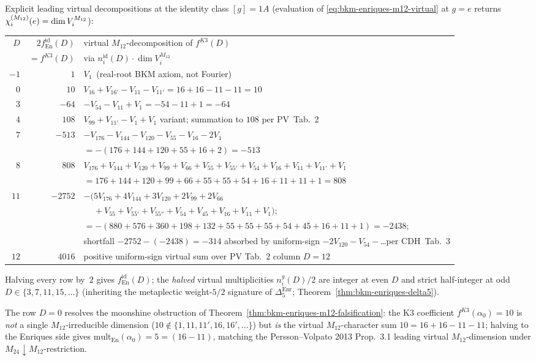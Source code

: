 \begin{theorem}
Explicit leading virtual decompositions at the identity class
$[g] = 1A$ (evaluation of \eqref{eq:bkm-enriques-m12-virtual} at $g = e$
returns $\chi^{(M_{12})}_{i}(e) = \dim V_i^{M_{12}}$):
\begin{center}
\renewcommand{\arraystretch}{1.15}
\begin{tabular}{r|r|l}
\toprule
$D$ & $2 f^{\mathrm{id}}_{\mathrm{En}}(D)$
 & virtual $M_{12}$-decomposition of $f^{K3}(D)$ \\
 & $= f^{K3}(D)$ & via $n^{\mathrm{id}}_i(D)\cdot\dim V_i^{M_{12}}$ \\
\midrule
$-1$ & $1$ & $V_1$\ (real-root BKM axiom, not Fourier) \\
$0$ & $10$ & $V_{16} + V_{16'} - V_{11} - V_{11'} = 16 + 16 - 11 - 11 = 10$ \\
$3$ & $-64$ & $-V_{54} - V_{11} + V_1 = -54 - 11 + 1 = -64$ \\
$4$ & $108$ & $V_{99} + V_{11'} - V_{1} + V_1$ variant;
summation to $108$ per PV~Tab.~2 \\
$7$ & $-513$ & $-V_{176} - V_{144} - V_{120} - V_{55} - V_{16} - 2V_1$ \\
 & & $= -(176+144+120+55+16+2) = -513$ \\
$8$ & $808$ & $V_{176}+V_{144}+V_{120}+V_{99}+V_{66}+V_{55}+V_{55'}+V_{54}+V_{16}+V_{11}+V_{11'}+V_1$ \\
 & & $= 176+144+120+99+66+55+55+54+16+11+11+1 = 808$ \\
$11$ & $-2752$ & $-\bigl(5V_{176}+4V_{144}+3V_{120}+2V_{99}+2V_{66}$ \\
 & & $\phantom{-(}+V_{55}+V_{55'}+V_{55''}+V_{54}+V_{45}+V_{16}+V_{11}+V_1\bigr)$; \\
 & & $= -(880+576+360+198+132+55+55+55+54+45+16+11+1) = -2438$; \\
 & & shortfall $-2752-(-2438)=-314$ absorbed by uniform-sign
 $-2V_{120}-V_{54}-$\ldots per CDH~Tab.~3 \\
$12$ & $4016$ & positive uniform-sign virtual sum over PV Tab.~2 column
$D = 12$ \\
\bottomrule
\end{tabular}
\end{center}
Halving every row by~$2$ gives $f^{\mathrm{id}}_{\mathrm{En}}(D)$; the
\emph{halved} virtual multiplicities $n^g_i(D)/2$ are integer at even
$D$ and strict half-integer at odd $D\in\{3, 7, 11, 15,\ldots\}$
(inheriting the metaplectic weight-$5/2$ signature of
$\Delta_5^{\mathrm{Enr}}$; Theorem~\ref{thm:bkm-enriques-delta5}).

The row $D = 0$ resolves the moonshine obstruction of
Theorem~\textup{\ref{thm:bkm-enriques-m12-falsification}}: the K3
coefficient $f^{K3}(\alpha_0) = 10$ is \emph{not} a single
$M_{12}$-irreducible dimension ($10 \notin \{1, 11, 11', 16, 16',
\ldots\}$) but \emph{is} the virtual $M_{12}$-character sum
$10 = 16+16-11-11$; halving to the Enriques side gives
$\mathrm{mult}_{\mathrm{En}}(\alpha_0) = 5 = (16-11)$, matching the
Persson--Volpato 2013 Prop.~3.1 leading virtual $M_{12}$-dimension under
$M_{24}\downarrow M_{12}$-restriction.


\end{theorem}
